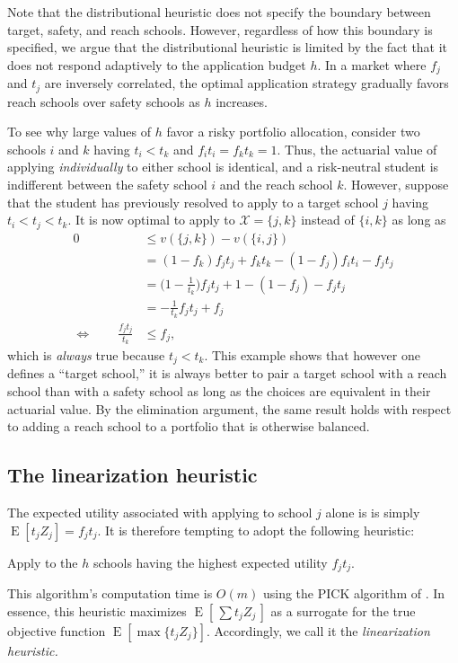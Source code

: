 Note that the distributional heuristic does not specify the boundary between target, safety, and reach schools. However, regardless of how this boundary is specified, we argue that the distributional heuristic is limited by the fact that it does not respond adaptively to the application budget $h$. In a market where $f_j$ and $t_j$ are inversely correlated, the optimal application strategy gradually favors reach schools over safety schools as $h$ increases.

To see why large values of $h$ favor a risky portfolio allocation, consider two schools $i$ and $k$ having $t_i < t_k$ and $f_i t_i = f_k t_k = 1$. Thus, the actuarial value of applying \emph{individually} to either school is identical, and a risk-neutral student is indifferent between the safety school $i$ and the reach school $k$. However, suppose that the student has previously resolved to apply to a target school $j$ having $t_i < t_j < t_k$. It is now optimal to apply to $\mathcal{X} = \{j, k\}$ instead of $\{i, k\}$ as long
as
\begin{align*}
0 &\leq v(\{j, k\}) - v(\{i, j\})\\
&= (1 - f_k ) f_j t_j + f_k t_k - (1 - f_j) f_i t_i - f_j t_j \\
&= \bigl( 1 - \frac{1}{t_k}\bigr) f_j t_j + 1 - (1 - f_j) - f_j t_j \\
&=  - \frac{1}{t_k} f_j t_j + f_j \\
\iff \qquad \frac{f_j t_j}{t_k } &\leq f_j,
\end{align*}
which is \emph{always} true because $t_j < t_k$. This example shows that however one defines a ``target school,'' it is always better to pair a target school with a reach school than with a safety school as long as the choices are equivalent in their actuarial value. By the elimination argument, the same result holds with respect to adding a reach school to a portfolio that is otherwise balanced.


\subsection{The linearization heuristic}

The expected utility associated with applying to school $j$ alone is is simply $\operatorname{E}[t_j Z_j] = f_j t_j$. It is therefore tempting to adopt the following heuristic:
\begin{definition} \label{naivealgorithm}
Apply to the $h$ schools having the highest expected utility $f_j t_j$.
\end{definition}
\noindent This algorithm's computation time is $O(m)$ using the PICK algorithm of \cite{blumetal1973}. In essence, this heuristic maximizes $\operatorname{E}\left[\,\sum t_j Z_j\, \right]$ as a surrogate for the true objective function $\operatorname{E}\left[\max \{t_j Z_j\} \right]$. Accordingly, we call it the \emph{linearization heuristic.}

